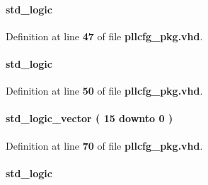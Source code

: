 \paragraph[{c1\+\_\+odddiv}]{ {\bfseries \textcolor{comment}{std\+\_\+logic}\textcolor{vhdlchar}{ }} \hspace{0.3cm}{\ttfamily [Record]}}\label{classpllcfg__pkg_a9dd835a04c213a7b0578f58dedbcdaa0}


Definition at line {\bf 47} of file {\bf pllcfg\+\_\+pkg.\+vhd}.

\paragraph[{c2\+\_\+byp}]{ {\bfseries \textcolor{comment}{std\+\_\+logic}\textcolor{vhdlchar}{ }} \hspace{0.3cm}{\ttfamily [Record]}}\label{classpllcfg__pkg_ab13f8ab6b2dece283f478bfece342406}


Definition at line {\bf 50} of file {\bf pllcfg\+\_\+pkg.\+vhd}.

\paragraph[{c2\+\_\+cnt}]{ {\bfseries \textcolor{comment}{std\+\_\+logic\+\_\+vector}\textcolor{vhdlchar}{ }\textcolor{vhdlchar}{(}\textcolor{vhdlchar}{ }\textcolor{vhdlchar}{ } \textcolor{vhdldigit}{15} \textcolor{vhdlchar}{ }\textcolor{keywordflow}{downto}\textcolor{vhdlchar}{ }\textcolor{vhdlchar}{ } \textcolor{vhdldigit}{0} \textcolor{vhdlchar}{ }\textcolor{vhdlchar}{)}\textcolor{vhdlchar}{ }} \hspace{0.3cm}{\ttfamily [Record]}}\label{classpllcfg__pkg_a088dd24739a05a4a24ede778de2ed637}


Definition at line {\bf 70} of file {\bf pllcfg\+\_\+pkg.\+vhd}.

\paragraph[{c2\+\_\+odddiv}]{ {\bfseries \textcolor{comment}{std\+\_\+logic}\textcolor{vhdlchar}{ }} \hspace{0.3cm}{\ttfamily [Record]}}\label{classpllcfg__pkg_a8f8214313e7673c92aca84f25acb5a96}


